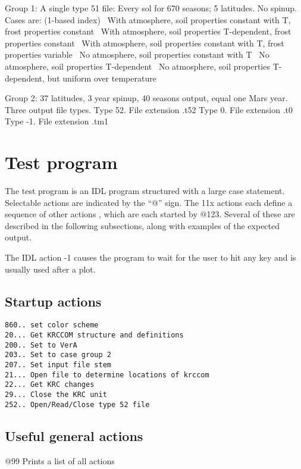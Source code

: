 \documentclass{article}  %
\begin{document}
Group 1:  A single type 51 file: Every sol for 670 seasons; 5 latitudes. No spinup.
Cases are: (1-based index)
 \ With atmosphere, soil properties constant with T, frost properties constant
 \ With atmosphere, soil properties T-dependent, frost properties constant
 \ With atmosphere, soil properties constant with T, frost properties variable
 \ No atmosphere, soil properties constant with T
 \ No atmosphere, soil properties T-dependent
 \ No atmosphere, soil properties T-dependent, but uniform over temperature

Group 2:  37 latitudes, 3 year spinup, 40 seasons output, equal one Mars year.
 Three output file types.
\qi Type 52.  File extension .t52
\qi Type 0. File extension .t0
\qi Type -1. File extension .tm1
 
\section{Test program} %

The test program is an IDL program structured with a large case
statement. Selectable actions are indicated by the ``@'' sign. The 11x actions
each define a sequence of other actions , which are each started by
@123. Several of these are described in the following subsections, along with examples of the expected output.

The IDL action -1 causes the program to wait for the user to hit any key and is usually used after a plot.

\subsection{Startup actions}
\vspace{-3.mm} 
\begin{verbatim}
860.. set color scheme
20... Get KRCCOM structure and definitions
200.. Set to VerA 
203.. Set to case group 2
207.. Set input file stem
21... Open file to determine locations of krccom
22... Get KRC changes
29... Close the KRC unit
252.. Open/Read/Close type 52 file
\end{verbatim}

\subsection{ Useful general actions}

@99 Prints a list of all actions
\end{document}
